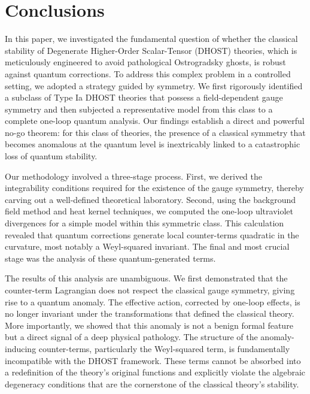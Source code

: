 \documentclass[twocolumn]{aastex631}
\begin{document}
\section{Conclusions}
\label{sec:conclusions}
In this paper, we investigated the fundamental question of whether the classical stability of Degenerate Higher-Order Scalar-Tensor (DHOST) theories, which is meticulously engineered to avoid pathological Ostrogradsky ghosts, is robust against quantum corrections. To address this complex problem in a controlled setting, we adopted a strategy guided by symmetry. We first rigorously identified a subclass of Type Ia DHOST theories that possess a field-dependent gauge symmetry and then subjected a representative model from this class to a complete one-loop quantum analysis. Our findings establish a direct and powerful no-go theorem: for this class of theories, the presence of a classical symmetry that becomes anomalous at the quantum level is inextricably linked to a catastrophic loss of quantum stability.

Our methodology involved a three-stage process. First, we derived the integrability conditions required for the existence of the gauge symmetry, thereby carving out a well-defined theoretical laboratory. Second, using the background field method and heat kernel techniques, we computed the one-loop ultraviolet divergences for a simple model within this symmetric class. This calculation revealed that quantum corrections generate local counter-terms quadratic in the curvature, most notably a Weyl-squared invariant. The final and most crucial stage was the analysis of these quantum-generated terms.

The results of this analysis are unambiguous. We first demonstrated that the counter-term Lagrangian does not respect the classical gauge symmetry, giving rise to a quantum anomaly. The effective action, corrected by one-loop effects, is no longer invariant under the transformations that defined the classical theory. More importantly, we showed that this anomaly is not a benign formal feature but a direct signal of a deep physical pathology. The structure of the anomaly-inducing counter-terms, particularly the Weyl-squared term, is fundamentally incompatible with the DHOST framework. These terms cannot be absorbed into a redefinition of the theory's original functions and explicitly violate the algebraic degeneracy conditions that are the cornerstone of the classical theory's stability.
\end{document}
